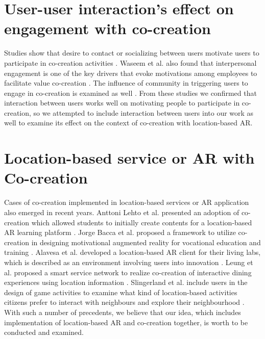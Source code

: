 \section{User-user interaction's effect on engagement with co-creation}
Studies show that desire to contact or socializing between users motivate users to participate in co-creation activities \cite{fernandes_remelhe_2016}\cite{engstrom_elg_2015}.
Waseem et al. also found that interpersonal engagement is one of the key drivers that evoke motivations among employees to facilitate value co-creation \cite{waseem_biggemann_garry_2020}.
The influence of community in triggering users to engage in co-creation is examined as well \cite{palma_trimi_hong_2018}\cite{zhang_kandampully_bilgihan_2015}.
From these studies we confirmed that interaction between users works well on motivating people to participate in co-creation,
so we attempted to include interaction between users into our work as well to examine its effect on the context of co-creation with location-based AR.

\section{Location-based service or AR with Co-creation}
Cases of co-creation implemented in location-based services or AR application also emerged in recent years.
Anttoni Lehto et al. presented an adoption of co-creation which allowed students to initially create contents for a location-based AR learning platform \cite{lehto_lautkankare_brander_alanissila_saari_salminen_2020}.
Jorge Bacca et al. proposed a framework to utilize co-creation in designing motivational augmented reality for vocational education and training \cite{acosta_navarro_gesa_kinshuk_2019}.
Alavesa et al. developed a location-based AR client for their living labs, which is described as an environment involving users into innovation \cite{alavesa_2018}.
Leung et al. proposed a smart service network to realize co-creation of interactive dining experiences using location information \cite{leung_loo_2020}.
Slingerland et al. include users in the design of game activities to examine what kind of location-based activities citizens prefer to interact with neighbours and explore their neighbourhood \cite{slingerland_fonseca_lukosch_brazier_2020}.
With such a number of precedents, we believe that our idea, which includes implementation of location-based AR and co-creation together, is worth to be conducted and examined.

